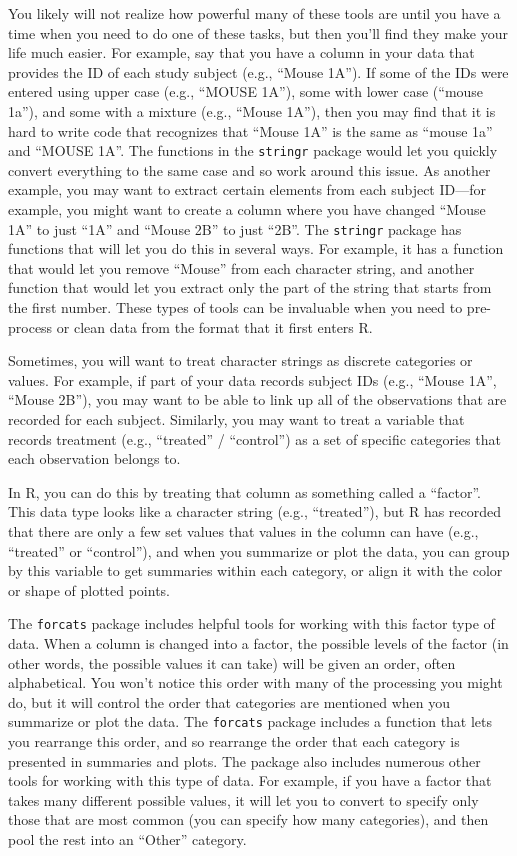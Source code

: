 \documentclass[]{tufte-book}
\begin{document}
You likely will not realize how powerful many of these tools are
until you have a time when you need to do one of these tasks, but
then you'll find they make your life much easier. For example,
say that you have a column in your data that provides the ID of each study
subject (e.g., ``Mouse 1A''). If some of the IDs were entered using upper
case (e.g., ``MOUSE 1A''), some with lower case (``mouse 1a''), and some with
a mixture (e.g., ``Mouse 1A''), then you may find that it is hard
to write code that recognizes that ``Mouse 1A'' is the same as ``mouse 1a'' and
``MOUSE 1A''. The functions in the \texttt{stringr} package would let you quickly
convert everything to the same case and so work around this issue.
As another example, you may want to extract certain elements from each
subject ID---for example, you might want to create a column where you
have changed ``Mouse 1A'' to just ``1A'' and ``Mouse 2B'' to just ``2B''. The
\texttt{stringr} package has functions that will let you do this in several
ways. For example, it has a function that would let you remove ``Mouse''
from each character string, and another function that would let you
extract only the part of the string that starts from the first number.
These types of tools can be invaluable when you need to pre-process or
clean data from the format that it first enters R.

Sometimes, you will want to treat character strings as discrete categories
or values. For example, if part of your data records subject IDs
(e.g., ``Mouse 1A'', ``Mouse 2B''), you may want to be able to link up all
of the observations that are recorded for each subject. Similarly, you
may want to treat a variable that records treatment (e.g., ``treated'' / ``control'')
as a set of specific categories that each observation belongs to.

In R, you can do this by treating that column as something called a ``factor''.
This data type looks like a character string (e.g., ``treated''), but R has
recorded that there are only a few set values that values in the column can have
(e.g., ``treated'' or ``control''), and when you summarize or plot the data, you can
group by this variable to get summaries within each category, or align it with
the color or shape of plotted points.

The \texttt{forcats} package includes helpful tools for working with this factor type
of data. When a column is changed into a factor, the possible levels of the
factor (in other words, the possible values it can take) will be given an order,
often alphabetical. You won't notice this order with many of the processing
you might do, but it will control the order that categories are mentioned when
you summarize or plot the data. The \texttt{forcats} package includes a function that
lets you rearrange this order, and so rearrange the order that each category
is presented in summaries and plots. The package also includes numerous other
tools for working with this type of data. For example, if you have a factor
that takes many different possible values, it will let you to convert to
specify only those that are most common (you can specify how many categories),
and then pool the rest into an ``Other'' category.
\end{document}
